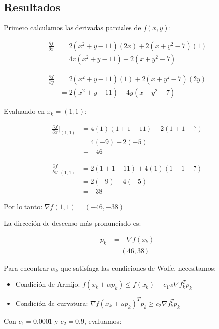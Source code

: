 \documentclass{article}
\begin{document}
\subsection{Resultados}
\setcounter{equation}{0}

Primero calculamos las derivadas parciales de $f(x,y)$:

\begin{align}
    \frac{\partial f}{\partial x} &= 2(x^2+y-11)(2x) + 2(x+y^2-7)(1) \\
    &= 4x(x^2+y-11) + 2(x+y^2-7)
\end{align}

\begin{align}
    \frac{\partial f}{\partial y} &= 2(x^2+y-11)(1) + 2(x+y^2-7)(2y) \\
    &= 2(x^2+y-11) + 4y(x+y^2-7)
\end{align}

Evaluando en $x_k = (1,1)$:

\begin{align}
    \frac{\partial f}{\partial x}\bigg|_{(1,1)} &= 4(1)(1+1-11) + 2(1+1-7) \\
    &= 4(-9) + 2(-5) \\
    &= -46
\end{align}

\begin{align}
    \frac{\partial f}{\partial y}\bigg|_{(1,1)} &= 2(1+1-11) + 4(1)(1+1-7) \\
    &= 2(-9) + 4(-5) \\
    &= -38
\end{align}

Por lo tanto: $\nabla f(1,1) = (-46, -38)$

La dirección de descenso más pronunciado es:

\begin{align}
    p_k &= -\nabla f(x_k) \\
    &= (46, 38)
\end{align}

Para encontrar $\alpha_k$ que satisfaga las condiciones de Wolfe, necesitamos:
\begin{itemize}
    \item Condición de Armijo: $f(x_k + \alpha p_k) \leq f(x_k) + c_1 \alpha \nabla f_k^T p_k$
    \item Condición de curvatura: $\nabla f(x_k + \alpha p_k)^T p_k \geq c_2 \nabla f_k^T p_k$
\end{itemize}

Con $c_1 = 0.0001$ y $c_2 = 0.9$, evaluamos:
\end{document}
